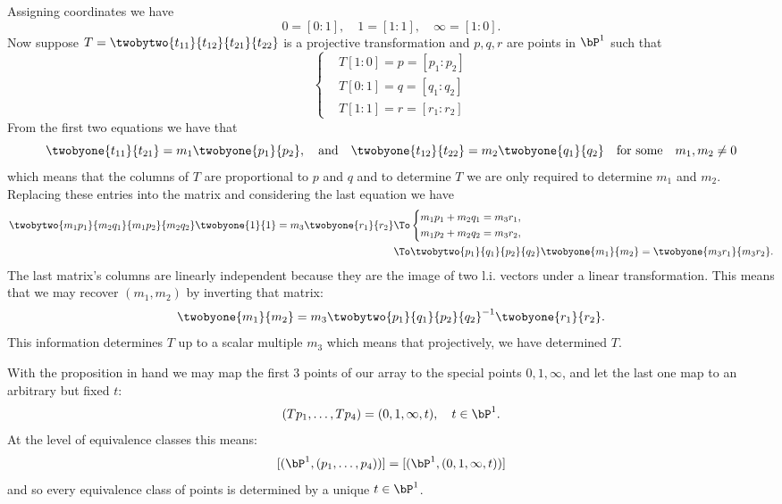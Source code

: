 \documentclass[12pt]{memoir}
\begin{document}
    \begin{ptcbp}
        Assigning coordinates we have 
        $$0=[0:1],\quad 1=[1:1],\quad \infty=[1:0].$$
        Now suppose $T=\twobytwo{t_{11}}{t_{12}}{t_{21}}{t_{22}}$ is a projective transformation and $p,q,r$ are points in $\bP^1$ such that
        $$
        \left\lbrace
        \begin{aligned}
            &T[1:0]=p=[p_1:p_2]\\
            &T[0:1]=q=[q_1:q_2]\\
            &T[1:1]=r=[r_1:r_2]
        \end{aligned}
        \right.
        $$
        From the first two equations we have that 
        $$\twobyone{t_{11}}{t_{21}}=m_1\twobyone{p_1}{p_2},\quad\text{and}\quad\twobyone{t_{12}}{t_{22}}=m_2\twobyone{q_1}{q_2}\quad\text{for some}\quad m_1,m_2\neq 0$$
        which means that the columns of $T$ are proportional to $p$ and $q$ and to determine $T$ we are only required to determine $m_1$ and $m_2$. Replacing these entries into the matrix and considering the last equation we have 
        \begin{align*}
            \twobytwo{m_1p_1}{m_2q_1}{m_1p_2}{m_2q_2}\twobyone{1}{1}=m_3\twobyone{r_1}{r_2}&\To \left\lbrace
        \begin{aligned}
            &m_1p_1+m_2q_1=m_3r_1,\\
            &m_1p_2+m_2q_2=m_3r_2,
        \end{aligned}
        \right.\\
        &\To \twobytwo{p_1}{q_1}{p_2}{q_2}\twobyone{m_1}{m_2}=\twobyone{m_3r_1}{m_3r_2}.
        \end{align*}
        The last matrix's columns are linearly independent because they are the image of two l.i. vectors under a linear transformation. This means that we may recover $(m_1,m_2)$ by inverting that matrix:
        $$\twobyone{m_1}{m_2}=m_3\twobytwo{p_1}{q_1}{p_2}{q_2}^{-1}\twobyone{r_1}{r_2}.$$
        This information determines $T$ up to a scalar multiple $m_3$ which means that projectively, we have determined $T$.
    \end{ptcbp}
    
    With the proposition in hand we may map the first $3$ points of our array to the special points $0,1,\infty$, and let the last one map to an arbitrary but fixed $t$:
    $$(Tp_1,\dots,Tp_4)=(0,1,\infty,t),\quad t\in\bP^1.$$
    At the level of equivalence classes this means:
    $$[(\bP^1,(p_1,\dots,p_4))]=[(\bP^1,(0,1,\infty,t))]$$
    and so every equivalence class of points is determined by a unique $t\in\bP^1$.
    
\end{document}
